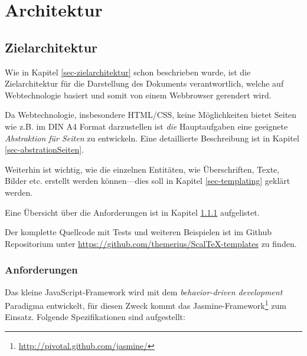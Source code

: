 \chapter{Architektur}\label{ch-architektur}

\section{Zielarchitektur}

Wie in Kapitel \ref{sec-zielarchitektur} schon beschrieben wurde, ist die
Zielarchitektur für die Darstellung des Dokuments verantwortlich, welche
auf Webtechnologie basiert und somit von einem Webbrowser gerendert wird.

Da Webtechnologie, insbesondere HTML/CSS, keine Möglichkeiten bietet
Seiten wie z.B. im DIN A4 Format darzustellen ist \emph{die}
Hauptaufgaben eine geeignete \emph{Abstraktion für Seiten} zu entwickeln.
Eine detaillierte Beschreibung ist in Kapitel \ref{sec-abstrationSeiten}.

Weiterhin ist wichtig, wie die einzelnen Entitäten, wie Überschriften,
Texte, Bilder etc. erstellt werden können---dies soll in Kapitel
\ref{sec-templating} geklärt werden.

Eine Übersicht über die Anforderungen ist in Kapitel
\ref{sec-ziel_anforderungen} aufgelistet.

Der komplette Quellcode mit Tests und weiteren Beispielen ist im
Github Repositorium unter \url{https://github.com/themerius/ScalTeX-templates}
zu finden.

\subsection{Anforderungen}\label{sec-ziel_anforderungen}

Das kleine JavaScript-Framework wird mit dem
\emph{behavior-driven development} Paradigma entwickelt,
für diesen Zweck kommt das
Jasmine-Framework\footnote{\url{http://pivotal.github.com/jasmine/}}
zum Einsatz. Folgende Spezifikationen sind aufgestellt:

